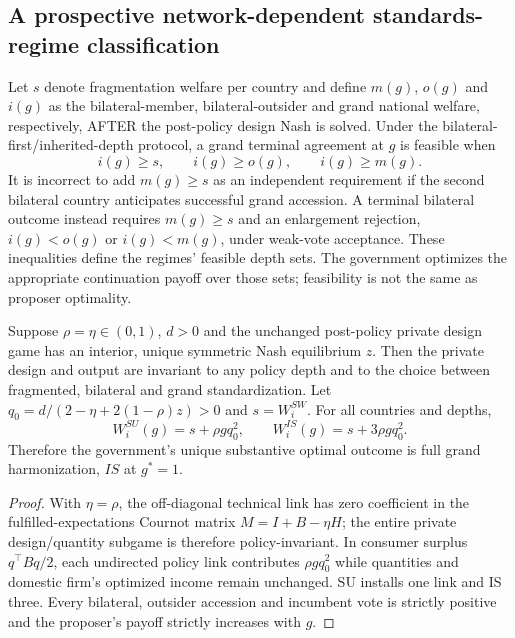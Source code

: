 \subsection{A prospective network-dependent standards-regime classification}

Let $s$ denote fragmentation welfare per country and define $m(g)$,
$o(g)$ and $i(g)$ as the bilateral-member, bilateral-outsider and grand
national welfare, respectively, AFTER the post-policy design Nash is solved.
Under the bilateral-first/inherited-depth protocol, a grand terminal
agreement at $g$ is feasible when
\[
 i(g)\ge s,\qquad i(g)\ge o(g),\qquad i(g)\ge m(g).
\]
It is incorrect to add $m(g)\ge s$ as an independent requirement if the
second bilateral country anticipates successful grand accession.
A terminal bilateral outcome instead requires $m(g)\ge s$ and an
enlargement rejection, $i(g)<o(g)$ or $i(g)<m(g)$, under weak-vote
acceptance. These inequalities define the regimes' feasible depth sets.
The government optimizes the appropriate continuation payoff over those
sets; feasibility is not the same as proposer optimality.

\begin{proposition}
Suppose $\rho=\eta\in(0,1)$, $d>0$ and the unchanged post-policy private
design game has an interior, unique symmetric Nash equilibrium $z$.
Then the private design and output are invariant to any policy depth and
to the choice between fragmented, bilateral and grand standardization.
Let $q_0=d/(2-\eta+2(1-\rho)z)>0$ and $s=W_i^{SW}$.
For all countries and depths,
\[
 W_i^{SU}(g)=s+\rho gq_0^2,\qquad
 W_i^{IS}(g)=s+3\rho gq_0^2.
\]
Therefore the government's unique substantive optimal outcome is full
grand harmonization, $IS$ at $g^*=1$.
\end{proposition}
\begin{proof}
With $\eta=\rho$, the off-diagonal technical link has zero coefficient
in the fulfilled-expectations Cournot matrix $M=I+B-\eta H$;
the entire private design/quantity subgame is therefore policy-invariant.
In consumer surplus $q^\top Bq/2$, each undirected policy link contributes
$\rho g q_0^2$ while quantities and domestic firm's optimized income
remain unchanged. SU installs one link and IS three. Every bilateral,
outsider accession and incumbent vote is strictly positive and the
proposer's payoff strictly increases with $g$.
\end{proof}

